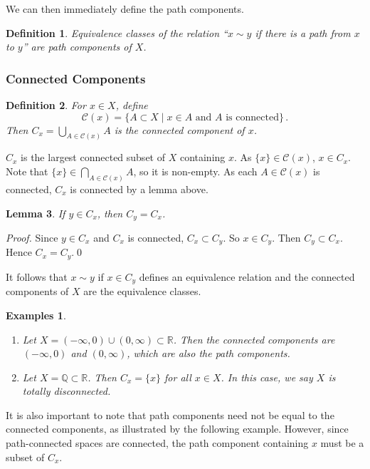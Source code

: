\documentclass{article}
\theoremstyle{plain}\theoremheaderfont{\normalfont\itshape}\theorembodyfont{\rmfamily}\theoremseparator{.}\newtheorem*{rem}{Remark}\newtheorem*{ex}{Example}\newtheorem*{proof}{Proof}\newtheorem*{altp}{Alternative proof}
\theoremstyle{plain}\theoremheaderfont{\normalfont\bfseries}\theorembodyfont{\rmfamily}\theoremseparator{.}\newtheorem{thm}{Theorem}[section]\newtheorem{lem}[thm]{Lemma}\newtheorem{prop}[thm]{Proposition}\newtheorem*{cor}{Corollary}\newtheorem{defn}[thm]{Definition}\newtheorem{clm}[thm]{Claim}\newtheorem{clminproof}{Claim}
\theoremstyle{break}\theoremheaderfont{\normalfont\itshape}\theorembodyfont{\rmfamily}\theoremseparator{.\medskip}\newtheorem*{proofskip}{Proof}\newtheorem*{exs}{Examples}\newtheorem*{rems}{Remarks}
\theoremstyle{break}\theoremheaderfont{\normalfont\bfseries}\theorembodyfont{\rmfamily}\theoremseparator{.\medskip}\newtheorem{lemskip}[thm]{Lemma}\newtheorem{defnskip}[thm]{Definition}\newtheorem{propskip}[thm]{Proposition}\newtheorem{thmskip}[thm]{Theorem}
\newcommand{\qed}{\hfill\ensuremath{\Box}}
\begin{document}
    We can then immediately define the path components.

    \begin{defn}
        Equivalence classes of the relation ``\(x\sim y\) if there is a path from \(x\) to \(y\)'' are \textit{path components} of \(X\).
    \end{defn}
    \subsubsection{Connected Components}
    \begin{defn}
        For \(x\in X\), define
        \[\mathcal{C}(x)=\{A\subset X\mid x\in A \text{ and }A\text{ is connected}\}\,.\]
        Then \(C_x=\bigcup_{A\in\mathcal{C}(x)}A\) is the \textit{connected component} of \(x\).
    \end{defn}

    \(C_x\) is the largest connected subset of \(X\) containing \(x\). As \(\{x\}\in\mathcal{C}(x)\), \(x\in C_x\). Note that \(\{x\}\in\bigcap_{A\in\mathcal{C}(x)}A\), so it is non-empty. As each \(A\in\mathcal{C}(x)\) is connected, \(C_x\) is connected by a lemma above.

    \begin{lem}
        If \(y\in C_x\), then \(C_y=C_x\).
    \end{lem}
    \begin{proof}
        Since \(y\in C_x\) and \(C_x\) is connected, \(C_x\subset C_y\). So \(x\in C_y\). Then \(C_y\subset C_x\). Hence \(C_x=C_y\).\qed
    \end{proof}

    It follows that \(x\sim y\) if \(x\in C_y\) defines an equivalence relation and the connected components of \(X\) are the equivalence classes.

    \begin{exs}
        \begin{enumerate}[label=(\roman*),topsep=0pt]
            \item Let \(X=(-\infty,0)\cup(0,\infty)\subset\mathbb{R}\). Then the connected components are \((-\infty,0)\) and \((0,\infty)\), which are also the path components.
            \item Let \(X=\mathbb{Q}\subset\mathbb{R}\). Then \(C_x=\{x\}\) for all \(x\in X\). In this case, we say \(X\) is \textit{totally disconnected}.
        \end{enumerate}
    \end{exs}

    It is also important to note that path components need not be equal to the connected components, as illustrated by the following example. However, since path-connected spaces are connected, the path component containing \(x\) must be a subset of \(C_x\).
    
\end{document}
